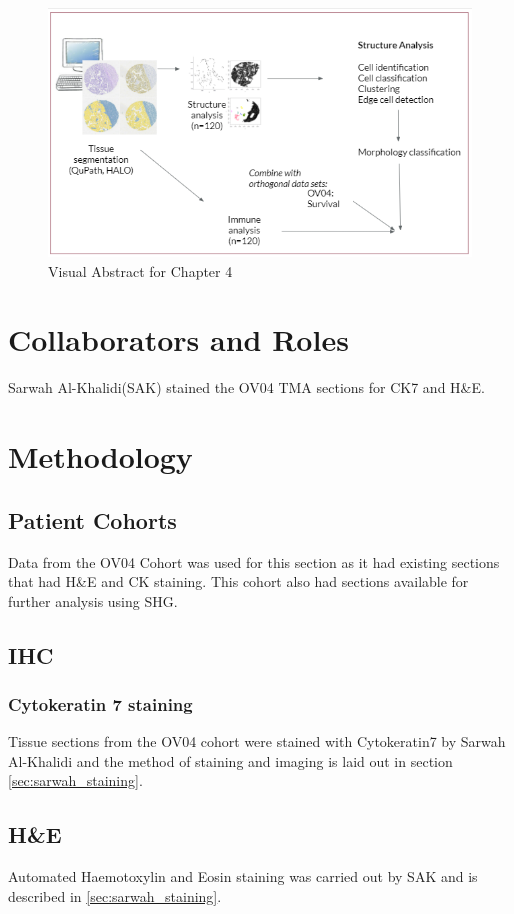 \begin{figure}
    \centering
    \includegraphics{Chapter3/Figs/VAch2_2.png}
    \caption{Visual Abstract for Chapter 4}
    \label{fig:VA_ch4_2}
\end{figure}

\section{Collaborators and Roles}
Sarwah Al-Khalidi(SAK) stained the OV04 TMA sections for CK7 and H\&E.

\section{Methodology}
\subsection{Patient Cohorts}
Data from the OV04 Cohort was used for this section as it had existing sections that had H\&E and CK staining. This cohort also had sections available for further analysis using SHG. 

\subsection{IHC}
\subsubsection{Cytokeratin 7 staining}
Tissue sections from the OV04 cohort were stained with Cytokeratin7 by Sarwah Al-Khalidi and the method of staining and imaging is laid out in section \ref{sec:sarwah_staining}.

\subsection{H\&E}
Automated Haemotoxylin and Eosin staining was carried out by SAK and is described in \ref{sec:sarwah_staining}. 

